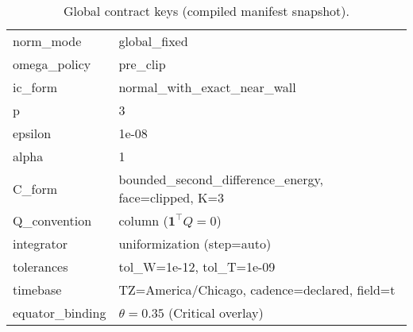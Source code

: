 \begin{table}[h]
\caption{Global contract keys (compiled manifest snapshot).}
\begin{tabular}{l l}
\hline
norm\_mode & global_fixed \\
omega\_policy & pre_clip \\
ic\_form & normal_with_exact_near_wall \\
p & 3 \\
epsilon & 1e-08 \\
alpha & 1 \\
C\_form & bounded_second_difference_energy, face=clipped, K=3 \\
Q\_convention & column ($\mathbf{1}^\top Q=0$) \\
integrator & uniformization (step=auto) \\
tolerances & tol\_W=1e-12,\; tol\_T=1e-09 \\
timebase & TZ=America/Chicago,\; cadence=declared,\; field=t \\
equator\_binding & $\theta=0.35$ (Critical overlay) \\
\hline
\end{tabular}
\end{table}

